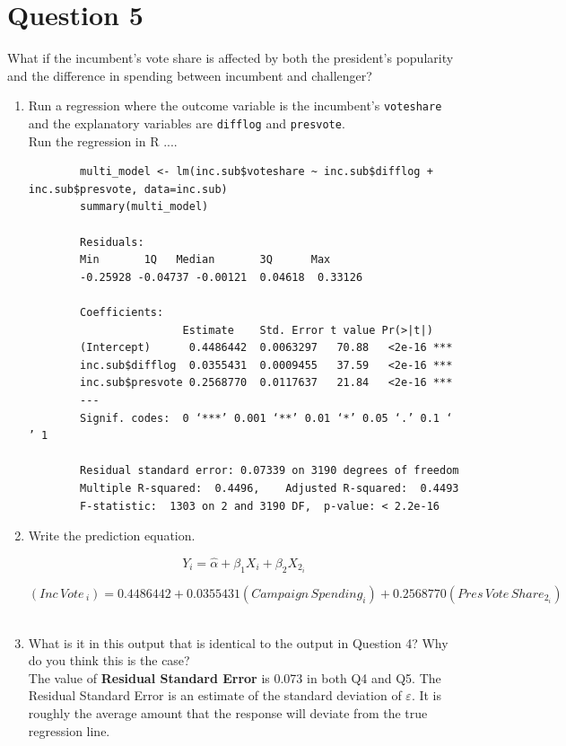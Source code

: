 \documentclass[12pt,letterpaper]{article}
\begin{document}
\section*{Question 5}
\noindent What if the incumbent's vote share is affected by both the president's popularity and the difference in spending between incumbent and challenger? 
	\begin{enumerate}
		\item Run a regression where the outcome variable is the incumbent's \texttt{voteshare} and the explanatory variables are \texttt{difflog} and \texttt{presvote}.	\\
		
		Run the regression in R ....
					\begin{verbatim}
		multi_model <- lm(inc.sub$voteshare ~ inc.sub$difflog + inc.sub$presvote, data=inc.sub)
		summary(multi_model)
		
		Residuals:
		Min       1Q   Median       3Q      Max 
		-0.25928 -0.04737 -0.00121  0.04618  0.33126 
		
		Coefficients:
						Estimate    Std. Error t value Pr(>|t|)    
		(Intercept)      0.4486442  0.0063297   70.88   <2e-16 ***
		inc.sub$difflog  0.0355431  0.0009455   37.59   <2e-16 ***
		inc.sub$presvote 0.2568770  0.0117637   21.84   <2e-16 ***
		---
		Signif. codes:  0 ‘***’ 0.001 ‘**’ 0.01 ‘*’ 0.05 ‘.’ 0.1 ‘ ’ 1
		
		Residual standard error: 0.07339 on 3190 degrees of freedom
		Multiple R-squared:  0.4496,	Adjusted R-squared:  0.4493 
		F-statistic:  1303 on 2 and 3190 DF,  p-value: < 2.2e-16
					\end{verbatim}
					
		\item Write the prediction equation.	
		
		{\large 			$$ {Y}_i = \hat{\alpha} +  {\beta_1}X_i + {\beta_2}X_{2_i} $$}
		
		
		{ $$ ({Inc\, Vote \,}_i) =  0.4486442 + 0.0355431(Campaign \, Spending_i) + 0.2568770 (Pres\, Vote\, Share_{2_i} ) $$  } \\
		
		
		\item What is it in this output that is identical to the output in Question 4? Why do you think this is the case? \\
		
		The value of \textbf{Residual Standard Error} is 0.073 in both Q4 and Q5. 		The Residual Standard Error is an estimate of the standard deviation of  $\varepsilon$. It is roughly the average amount that the response will deviate from the true regression line.
		

\end{enumerate}
\end{document}
